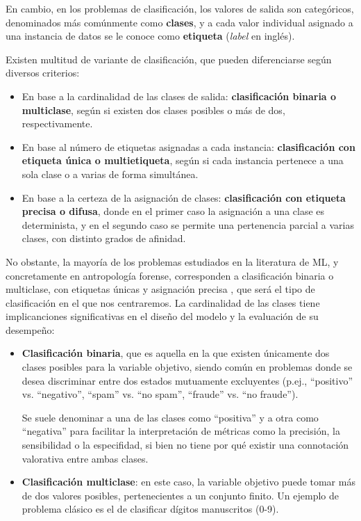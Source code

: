 En cambio, en los problemas de clasificación, los valores de salida son categóricos, denominados más 
comúnmente como \textbf{clases}, y a cada valor individual asignado a una instancia de datos se le conoce como 
\textbf{etiqueta} (\textit{label} en inglés).

Existen multitud de variante de clasificación, que pueden diferenciarse según diversos criterios:

\begin{itemize}
    \item En base a la cardinalidad de las clases de salida: \textbf{clasificación binaria o multiclase}, 
    según si existen dos clases posibles o más de dos, respectivamente.

    \item En base al número de etiquetas asignadas a cada instancia: \textbf{clasificación con etiqueta única 
    o multietiqueta}, según si cada instancia pertenece a una sola clase o a varias de forma simultánea.

    \item En base a la certeza de la asignación de clases: \textbf{clasificación con etiqueta precisa o 
    difusa}, donde en el primer caso la asignación a una clase es determinista, y en el segundo caso se 
    permite una pertenencia parcial a varias clases, con distinto grados de afinidad.
    
\end{itemize}

No obstante, la mayoría de los problemas estudiados en la literatura de ML, y concretamente en antropología 
forense, corresponden a clasificación binaria o multiclase, con etiquetas únicas y asignación precisa 
\cite{bishop2006}, que será el tipo de clasificación en el que nos centraremos. La cardinalidad de las 
clases tiene implicanciones significativas en el diseño del modelo y la evaluación de su desempeño:

\begin{itemize}

    \item \textbf{Clasificación binaria}, que es aquella en la que existen únicamente dos clases posibles para 
    la variable objetivo, siendo común en problemas donde se desea discriminar entre dos estados mutuamente 
    excluyentes (p.ej., ``positivo'' vs. ``negativo'', ``spam'' vs. ``no spam'', ``fraude'' vs. ``no 
    fraude'').
    
    Se suele denominar a una de las clases como ``positiva'' y a otra como ``negativa'' para facilitar la 
    interpretación de métricas como la precisión, la sensibilidad o la especifidad, si bien no tiene por qué 
    existir una connotación valorativa entre ambas clases.
    
    \item \textbf{Clasificación multiclase}: en este caso, la variable objetivo puede tomar más de dos valores 
    posibles, pertenecientes a un conjunto finito. Un ejemplo de problema clásico es el de clasificar dígitos
    manuscritos (0-9).

\end{itemize}

